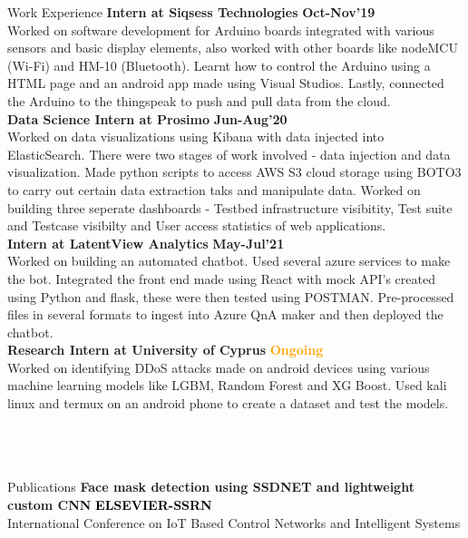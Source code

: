 \documentclass{resume}
\begin{document}
\begin{rSection}{Work Experience}
{\bf Intern at Siqsess Technologies } 
\hfill{\textbf{\textcolor{OliveGreen}{Oct-Nov'19}}} \\
Worked on software development for Arduino boards integrated with various sensors and basic display elements, also worked with other boards like nodeMCU (Wi-Fi) and HM-10 (Bluetooth). Learnt how to control the Arduino using a HTML page and an android app made using Visual Studios. Lastly,  connected the Arduino to the thingspeak to push and pull data from the cloud.\\
{\bf Data Science Intern at Prosimo} 
\hfill{\textbf{\textcolor{OliveGreen}{Jun-Aug'20}}} \\
Worked on data visualizations using Kibana with data injected into ElasticSearch. There were two stages of work involved - data injection and data visualization. Made python scripts to access AWS S3 cloud storage using BOTO3 to carry out certain data extraction taks and manipulate data. Worked on building three seperate dashboards - Testbed infrastructure visibitity, Test suite and Testcase visibilty and User access statistics of web applications.\\
{\bf Intern at LatentView Analytics} 
\hfill{\textbf{\textcolor{OliveGreen}{May-Jul'21}}} \\
Worked on building an automated chatbot. Used several azure services to make the bot. Integrated the front end  made using React with mock API's created using Python and flask, these were then tested using POSTMAN. Pre-processed files in several formats to ingest into Azure QnA maker and then deployed the chatbot.  \\
{\bf Research Intern at University of Cyprus} 
\hfill{\textbf{\textcolor{Orange}{Ongoing }}} \\
Worked on identifying DDoS attacks made on android devices using various machine learning models like LGBM, Random Forest and XG Boost. Used kali linux and termux on an android phone to create a dataset and test the models. \\\\\\\\
\end{rSection}
\begin{rSection}{Publications}
{\bf Face mask detection using SSDNET and lightweight custom CNN}
\hfill{\textbf{\textcolor{Black}{ELSEVIER-SSRN}}}\\
International Conference on IoT Based Control Networks and Intelligent Systems
\end{rSection}
\end{document}
